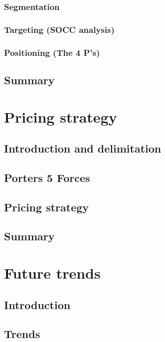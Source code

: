 \documentclass[a4paper,11pt,fleqn,dvipsnames,oneside,openright]{memoir}
\begin{document}
\subsection{Segmentation}

\subsection{Targeting (SOCC analysis)}

\subsection{Positioning (The 4 P's)}

\section{Summary}



\chapter{Pricing strategy}
\label{Chapter3}
\section{Introduction and delimitation}

\section{Porters 5 Forces}

\section{Pricing strategy}

\section{Summary}


\chapter{Future trends}
\section{Introduction}

\section{Trends}

\end{document}
